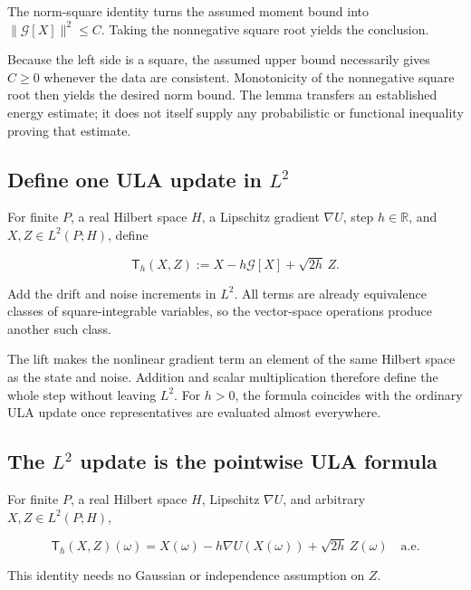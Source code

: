 \documentclass[11pt,a4paper]{report}
\begin{document}
The norm-square identity turns the assumed moment bound into \(\|\mathcal G[X]\|^2\le C\). Taking the nonnegative square root yields the conclusion.



Because the left side is a square, the assumed upper bound necessarily gives \(C\ge0\) whenever the data are consistent. Monotonicity of the nonnegative square root then yields the desired norm bound. The lemma transfers an established energy estimate; it does not itself supply any probabilistic or functional inequality proving that estimate.

\subsection{\texorpdfstring{Define one ULA update in \(L^2\)}{Define one ULA update in L²}}
\label{report-step-UnadjustedLangevin-LpDrift-lean-11}


For finite \(P\), a real Hilbert space \(H\), a Lipschitz gradient \(\nabla U\), step \(h\in\mathbb R\), and \(X,Z\in L^2(P;H)\), define

\[\mathsf T_h(X,Z):=X-h\mathcal G[X]+\sqrt{2h}\,Z.\]

Add the drift and noise increments in \(L^2\). All terms are already equivalence classes of square-integrable variables, so the vector-space operations produce another such class.



The lift makes the nonlinear gradient term an element of the same Hilbert space as the state and noise. Addition and scalar multiplication therefore define the whole step without leaving \(L^2\). For \(h>0\), the formula coincides with the ordinary ULA update once representatives are evaluated almost everywhere.

\subsection{\texorpdfstring{The \(L^2\) update is the pointwise ULA formula}{The L² update is the pointwise ULA formula}}
\label{report-step-UnadjustedLangevin-LpDrift-lean-12}


For finite \(P\), a real Hilbert space \(H\), Lipschitz \(\nabla U\), and arbitrary \(X,Z\in L^2(P;H)\),

\[\mathsf T_h(X,Z)(\omega)=X(\omega)-h\nabla U(X(\omega))+\sqrt{2h}\,Z(\omega)\quad\text{a.e.}\]

This identity needs no Gaussian or independence assumption on \(Z\).
\end{document}
